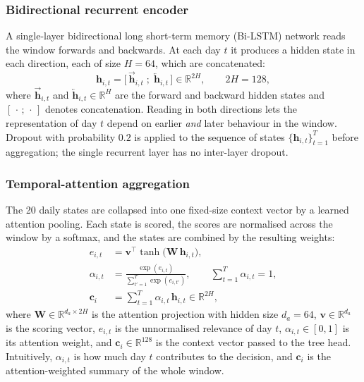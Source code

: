 \subsubsection{Bidirectional recurrent encoder}
\label{subsubsec:encoder}
A single-layer bidirectional long short-term memory (Bi-LSTM) network reads
the window forwards and backwards. At each day \(t\) it produces a
hidden state in each direction, each of size \(H=64\), which are
concatenated:
\begin{equation}
\mathbf h_{i,t}
=
\big[\,\overrightarrow{\mathbf h}_{i,t}\;;\;\overleftarrow{\mathbf h}_{i,t}\,\big]
\in\mathbb R^{2H},
\qquad 2H=128,
\label{eq:bilstm}
\end{equation}
where \(\overrightarrow{\mathbf h}_{i,t}\) and
\(\overleftarrow{\mathbf h}_{i,t}\in\mathbb R^{H}\) are the forward and
backward hidden states and \([\,\cdot\,;\,\cdot\,]\) denotes concatenation.
Reading in both directions lets the representation of day \(t\) depend on
earlier \emph{and} later behaviour in the window. Dropout with probability
\(0.2\) is applied to the sequence of states
\(\{\mathbf h_{i,t}\}_{t=1}^{T}\) before aggregation; the single recurrent
layer has no inter-layer dropout.

\subsubsection{Temporal-attention aggregation}
\label{subsubsec:attention}
The 20 daily states are collapsed into one fixed-size context vector by a
learned attention pooling. Each state is scored, the scores are normalised
across the window by a softmax, and the states are combined by the
resulting weights:
\begin{align}
e_{i,t}
&=
\mathbf v^{\!\top}\tanh\!\big(\mathbf W\,\mathbf h_{i,t}\big),
\label{eq:attn_score}\\[2pt]
\alpha_{i,t}
&=
\frac{\exp(e_{i,t})}{\sum_{t'=1}^{T}\exp(e_{i,t'})},
\qquad
\sum_{t=1}^{T}\alpha_{i,t}=1,
\label{eq:attn_weight}\\[2pt]
\mathbf c_i
&=
\sum_{t=1}^{T}\alpha_{i,t}\,\mathbf h_{i,t}
\in\mathbb R^{2H},
\label{eq:context}
\end{align}
where \(\mathbf W\in\mathbb R^{d_a\times 2H}\) is the attention projection
with hidden size \(d_a=64\), \(\mathbf v\in\mathbb R^{d_a}\) is the scoring
vector, \(e_{i,t}\) is the unnormalised relevance of day \(t\),
\(\alpha_{i,t}\in[0,1]\) is its attention weight, and
\(\mathbf c_i\in\mathbb R^{128}\) is the context vector passed to the tree
head. Intuitively, \(\alpha_{i,t}\) is how much day \(t\) contributes to the
decision, and \(\mathbf c_i\) is the attention-weighted summary of the whole
window.

